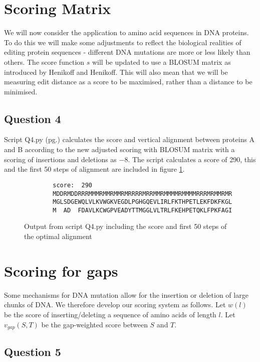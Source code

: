\documentclass[a4paper]{article}
\begin{document}
\section*{Scoring Matrix}
We will now consider the application to amino acid sequences in DNA proteins. To do this we will make some adjustments to reflect the biological realities of editing protein sequences - different DNA mutations are more or less likely than others. The score function $s$ will be updated to use a BLOSUM matrix as introduced by Henikoff and Henikoff. This will also mean that we will be measuring edit distance as a score to be maximised, rather than a distance to be minimised.

\subsection*{Question 4}
Script Q4.py (pg.\pageref{PQ4}) calculates the score and vertical alignment between proteins A and B according to the new adjusted scoring with BLOSUM matrix with a scoring of insertions and deletions as $-8$. The script calculates a score of 290, this and the first 50 steps of alignment are included in figure \ref{fig:q4}.
\begin{figure}[H]
    \centering
    \begin{verbatim}
        score:  290
        MDDRMDDRRRMMMRMMRMMRMRRRRMRRMMRMMMMRMMMMRRRMRMMRMR
        MGLSDGEWQLVLKVWGKVEGDLPGHGQEVLIRLFKTHPETLEKFDKFKGL
        M  AD  FDAVLKCWGPVEADYTTMGGLVLTRLFKEHPETQKLFPKFAGI
    \end{verbatim}
    \caption{Output from script Q4.py including the score and first 50 steps of the optimal alignment}
    \label{fig:q4}
\end{figure}

\section*{Scoring for gaps}

Some mechanisms for DNA mutation allow for the insertion or deletion of large chunks of DNA. We therefore develop our scoring system as follows. Let $w(l)$ be the score of inserting/deleting a sequence of amino acids of length $l$. Let $v_{gap}(S,T)$ be the gap-weighted score between $S$ and $T$.

\subsection*{Question 5}
\end{document}
